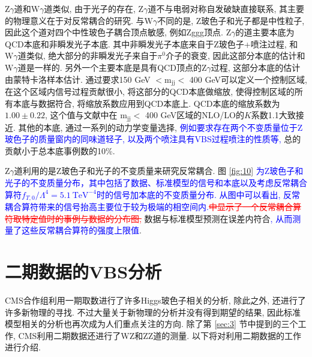 \documentclass{SCIS2020cn}
\newcommand{\Wboson}{\text{W}}
\newcommand{\Zboson}{\text{Z}}
\newcommand{\mass}{\text{m}}
\newcommand{\add}{\textcolor{blue}}
\newcommand{\rmv}[1]{\textcolor{red}{\sout{#1}}}
\begin{document}
$\Zboson\gamma$道和$\Wboson\gamma$道类似, 由于光子的存在, $\Zboson\gamma$道不与电弱对称自发破缺直接联系, 其主要的物理意义在于对反常耦合的研究. 与$\Wboson\gamma$不同的是, Z玻色子和光子都是中性粒子, 因此这个道对四个中性玻色子耦合顶点敏感, 例如Zggg顶点. $\Zboson\gamma$的道主要本底为QCD本底和非瞬发光子本底. 其中非瞬发光子本底来自于Z玻色子+喷注过程, 和$\Wboson\gamma$道类似, 绝大部分的非瞬发光子来自于$\pi^0$介子的衰变, 因此这部分本底的估计和$\Wboson\gamma$道是一样的. 另外一个主要本底是具有QCD顶点的$\Zboson\gamma$过程, 这部分本底的估计由蒙特卡洛样本估计. 通过要求150 GeV $< \mass_{\text{jj}} < $ 400 GeV可以定义一个控制区域, 在这个区域内信号过程贡献很小, 将这部分的QCD本底做缩放, 使得控制区域的所有本底与数据符合, 将缩放系数应用到QCD本底上. QCD本底的缩放系数为$1.00\pm0.22$, 这个值与文献中在 $\mass_{\text{jj}} <$ 400 GeV区域的NLO/LO的$K$系数1.1大致接近. 其他的本底, 通过一系列的动力学变量选择, \add{例如要求存在两个不变质量位于$\Zboson$玻色子的质量窗内的同味道轻子, 以及两个喷注具有VBS过程喷注的性质等,} 总的贡献小于总本底事例数的10\%. 

$\Zboson\gamma$道利用的是Z玻色子和光子的不变质量来研究反常耦合. 图 \ref{fig:10} \add{为Z玻色子和光子的不变质量分布，其中包括了数据、标准模型的信号和本底以及考虑反常耦合算符$f_{T,0}/\Lambda^4=5.1\ \text{TeV}^{-4}$时的信号加本底的不变质量分布. 从图中可以看出, 反常耦合算符带来的信号抬高主要位于较为极端的相空间内.}\rmv{中显示了一个反常耦合算符取特定值时的事例与数据的分布图,} 数据与标准模型预测在误差内符合\add{, 从而测量了这些反常耦合算符的强度上限值}.

\section{二期数据的VBS分析}

CMS合作组利用一期取数进行了许多Higgs玻色子相关的分析, 除此之外, 还进行了许多新物理的寻找. 不过大量关于新物理的分析并没有得到期望的结果, 因此标准模型相关的分析也再次成为人们重点关注的方向. 除了第 \ref{sec:3} 节中提到的三个工作, CMS利用二期数据还进行了WZ和ZZ道的测量. 以下将对利用二期数据的工作进行介绍. 
\end{document}
